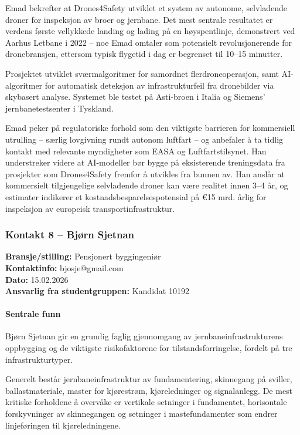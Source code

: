 Emad bekrefter at Drones4Safety utviklet et system av autonome, selvladende droner for inspeksjon av broer og jernbane. Det mest sentrale resultatet er verdens første vellykkede landing og lading på en høyspentlinje, demonstrert ved Aarhus Letbane i 2022 – noe Emad omtaler som potensielt revolusjonerende for dronebransjen, ettersom typisk flygetid i dag er begrenset til 10–15 minutter.

Prosjektet utviklet sværmalgoritmer for samordnet flerdroneoperasjon, samt AI-algoritmer for automatisk deteksjon av infrastrukturfeil fra dronebilder via skybasert analyse. Systemet ble testet på Asti-broen i Italia og Siemens' jernbanetestsenter i Tyskland.

Emad peker på regulatoriske forhold som den viktigste barrieren for kommersiell utrulling – særlig lovgivning rundt autonom luftfart – og anbefaler å ta tidlig kontakt med relevante myndigheter som EASA og Luftfartstilsynet. Han understreker videre at AI-modeller bør bygge på eksisterende treningsdata fra prosjekter som Drones4Safety fremfor å utvikles fra bunnen av. Han anslår at kommersielt tilgjengelige selvladende droner kan være realitet innen 3–4 år, og estimater indikerer et kostnadsbesparelsespotensial på €15 mrd. årlig for inspeksjon av europeisk transportinfrastruktur.

\subsubsection{Kontakt 8  – Bjørn Sjetnan}
\label{kontakt:sjetnan}

\textbf{Bransje/stilling:} Pensjonert byggingeniør \\
\textbf{Kontaktinfo:} bjosje@gmail.com \\
\textbf{Dato:} 15.02.2026 \\
\textbf{Ansvarlig fra studentgruppen:} Kandidat 10192

\paragraph{Sentrale funn}

Bjørn Sjetnan gir en grundig faglig gjennomgang av jernbaneinfrastrukturens oppbygging og de viktigste risikofaktorene for tilstandsforringelse, fordelt på tre infrastrukturtyper.

Generelt består jernbaneinfrastruktur av fundamentering, skinnegang på sviller, ballastmateriale, master for kjørestrøm, kjøreledninger og signalanlegg. De mest kritiske forholdene å overvåke er vertikale setninger i fundamentet, horisontale forskyvninger av skinnegangen og setninger i mastefundamenter som endrer linjeføringen til kjøreledningene.

